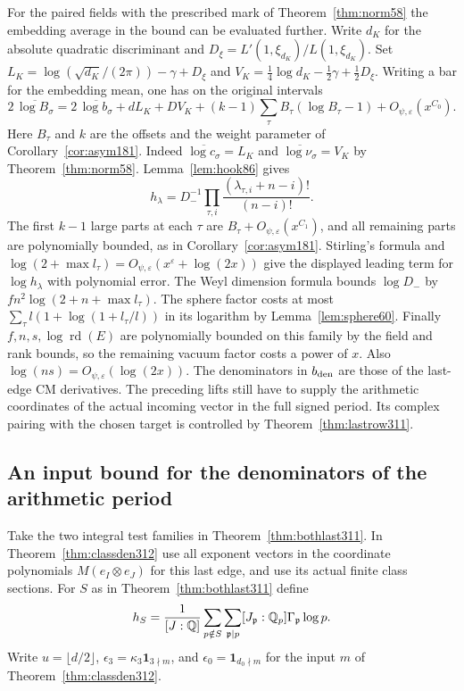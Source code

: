 \documentclass[a4paper,11pt]{article}
\theoremstyle{definition}
\theoremstyle{remark}
\numberwithin{equation}{section}
\begin{document}
For the paired fields with the prescribed mark of
Theorem~\ref{thm:norm58} the embedding average in the bound
can be evaluated further. Write \(d_K\) for the absolute
quadratic discriminant and \(D_\xi=L'(1,\xi_{d_K})/L(1,\xi_{d_K})\).
Set \(L_K=\log(\sqrt{d_K}/(2\pi))-\gamma+D_\xi\) and
\(V_K=\tfrac14\log d_K-\tfrac12\gamma+\tfrac12D_\xi\).
Writing a bar for the embedding mean, one has on the
original intervals
\[
 2\,\overline{\log B_\sigma}
 =2\,\overline{\log b_\sigma}+dL_K+D V_K
     +(k-1)\sum_\tau B_\tau(\log B_\tau-1)
     +O_{\psi,\varepsilon}(x^{C_0}) .
\]
Here \(B_\tau\) and \(k\) are the offsets and the weight
parameter of Corollary~\ref{cor:asym181}.
Indeed \(\overline{\log c_\sigma}=L_K\) and
\(\overline{\log\nu_\sigma}=V_K\) by Theorem~\ref{thm:norm58}.
Lemma~\ref{lem:hook86} gives
\[
 h_\lambda=D_-^{-1}\prod_{\tau,i}
                \frac{(\lambda_{\tau,i}+n-i)!}{(n-i)!}.
\]
The first \(k-1\) large parts at each \(\tau\) are
\(B_\tau+O_{\psi,\varepsilon}(x^{C_1})\), and all remaining
parts are polynomially bounded, as in
Corollary~\ref{cor:asym181}. Stirling's formula and
\(\log(2+\max l_\tau)=O_{\psi,\varepsilon}(x^\varepsilon+\log(2x))\)
give the displayed leading term for \(\log h_\lambda\) with
polynomial error. The Weyl dimension formula bounds
\(\log D_-\) by \(fn^2\log(2+n+\max l_\tau)\).
The sphere factor costs at most
\(\sum_\tau l(1+\log(1+l_\tau/l))\) in its logarithm by
Lemma~\ref{lem:sphere60}. Finally \(f,n,s,\log\operatorname{rd}(E)\)
are polynomially bounded on this family by the field and
rank bounds, so the remaining vacuum factor costs a power
of \(x\). Also \(\log(ns)=O_{\psi,\varepsilon}(\log(2x))\).
The denominators in
\(b_{\rm den}\) are those of the last-edge CM derivatives.
The preceding lifts still have to supply the arithmetic
coordinates of the actual incoming vector in the full
signed period. Its complex pairing with the chosen target
is controlled by Theorem~\ref{thm:lastrow311}.

\subsection{An input bound for the denominators of the arithmetic period}\label{nav:IX-63}
Take the two integral test families in Theorem~\ref{thm:bothlast311}.
In Theorem~\ref{thm:classden312} use all exponent vectors in the
coordinate polynomials \(M(e_I\otimes e_J)\) for this last edge,
and use its actual finite class sections. For \(S\) as in
Theorem~\ref{thm:bothlast311} define
\[
 h_S=\frac{1}{[J:\mathbb Q]}\sum_{p\notin S}\sum_{\mathfrak p\mid p}
           [J_{\mathfrak p}:\mathbb Q_p]\Gamma_{\mathfrak p}\log p.
\]
Write \(u=\lfloor d/2\rfloor\), \(\epsilon_3=\kappa_3\mathbf1_{3\nmid m}\),
and \(\epsilon_0=\mathbf1_{d_0\nmid m}\) for the input \(m\)
of Theorem~\ref{thm:classden312}.
\end{document}
